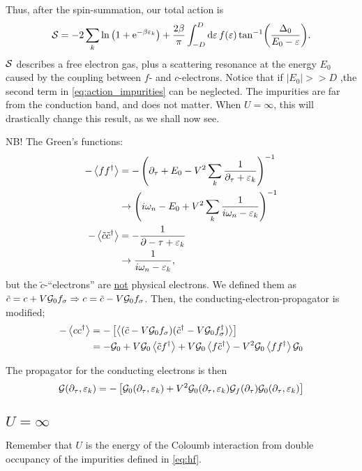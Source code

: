 Thus, after the spin-summation, our total action is
\begin{equation}
\label{eq:action_impurities}
	\mathcal{S} = -2\sum_k\ln\left(1 + \mathrm{e}^{-\beta\varepsilon_k}\right) + \frac{2\beta}{\pi}\int_{-D}^D\dd{\varepsilon}f(\varepsilon)\tan[-1](\frac{\Delta_0}{E_0 - \varepsilon}).
\end{equation}
$\mathcal{S}$ describes a free electron gas, plus a scattering resonance at the energy $E_0$ caused by the coupling between  $f$- and $c$-electrons. Notice that if $|E_0| >> D$ ,the second term in \eqref{eq:action_impurities} can be neglected. The impurities are far from the conduction band, and does not matter. When $U = \infty$, this will drastically change this result, as we shall now see.

NB! The Green's functions:
\begin{align*}
	-\ev{ff^\dagger} &= -\left(\partial_\tau + E_0 - V^2 \sum_k\frac{1}{\partial_\tau + \varepsilon_k}\right)^{-1}\\
	&\rightarrow \left(i\omega_n-E_0 + V^2\sum_k \frac{1}{i\omega_n - \varepsilon_k}\right)^{-1} \\
	-\ev{\tilde{c}\tilde{c}^\dagger} &= -\frac{1}{\partial-\tau + \varepsilon_k} \\
	&\rightarrow \frac{1}{i\omega_n-\varepsilon_k},
\end{align*}
but the $\tilde{c}$-``electrons'' are \underline{not} physical electrons. We defined them as $\tilde{c} = c+V\mathcal{G}_0 f_\sigma \Rightarrow c = \tilde{c} - V\mathcal{G}_0 f_\sigma$.
Then, the conducting-electron-propagator is modified;
\begin{align*}
	-\ev{cc^\dagger} &= -\left[\ev{(\tilde{c}-V\Gre f_\sigma)(\tilde{c}^\dagger - V\Gre f_\sigma^\dagger)}\right]\\
	&= -\Gre + V\Gre\ev{\tilde{c}f^\dagger} + V\Gre\ev{f\tilde{c}^\dagger} - V^2\Gre\ev{ff^\dagger}\Gre
\end{align*}

The propagator for the conducting electrons is then
\begin{equation}
	\mathcal{G}(\partial_\tau, \varepsilon_k) = -\left[\mathcal{G}_0(\partial_\tau, \varepsilon_k) + V^2\mathcal{G}_0(\partial_\tau, \varepsilon_k)\mathcal{G}_f(\partial_\tau)\mathcal{G}_0(\partial_\tau, \varepsilon_k)\right]
\end{equation}
\subsection{$U = \infty$}
Remember that $U$ is the energy of the Coloumb interaction from double occupancy of the impurities defined in \eqref{eq:hf}.
